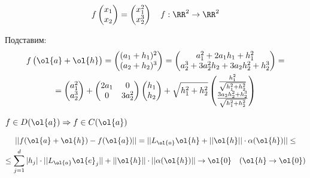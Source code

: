 \begin{example}{}{}
    \[
        f \begin{pmatrix}
            x_1
            \\
            x_2
        \end{pmatrix}
        =
        \begin{pmatrix}
            x_1^2
            \\
            x_2^3
        \end{pmatrix}
        \quad
        f : \RR^2 \to \RR^2
    \]

    Подставим:
    \begin{gather*}
        f \begin{pmatrix}
            \ol{a} + \ol{h}
        \end{pmatrix}
        =
        \begin{pmatrix}
            (a_1 + h_1)^2
            \\
            (a_2 + h_2)^3
        \end{pmatrix}
        =
        \begin{pmatrix}
            a_1^2 + 2 a_1 h_1 + h_1^2
            \\
            a_2^3 + 3 a_2^2 h_2 + 3 a_2 h_2^2 + h_2^3
        \end{pmatrix}
        =
        \\
        =
        \begin{pmatrix}
            a_1^2
            \\
            a_2^3
        \end{pmatrix}
        +
        \begin{pmatrix}
            2a_1 & 0
            \\
            0 & 3a_2^2
        \end{pmatrix}
        \begin{pmatrix}
            h_1
            \\
            h_2
        \end{pmatrix}
        +
        \sqrt{h_1^2 + h_2^2}
        \begin{pmatrix}
            \frac{h_1^2}{\sqrt{h_1^2 + h_2^2}}
            \\
            \frac{3 a_2 h_2^2 + h_2^3}{\sqrt{h_1^2 + h_2^2}}
        \end{pmatrix}
    \end{gather*}
\end{example}

\begin{prop}{}{}
    \( f \in D(\ol{a}) \Rightarrow f \in C(\ol{a}) \)
\end{prop}
\begin{gather*}
    ||f( \ol{a} + \ol{h} ) - f(\ol{a})||
    =
    || L_{\ol{a}} \ol{h} + || \ol{h} || \cdot \alpha(\ol{h}) ||
    \leq
    \\
    \leq
    \sum\limits_{j = 1}^{d} |h_j| \cdot || L_{\ol{a}} \ol{e}_j ||
        + || \ol{h} || \cdot || \alpha(\ol{h}) ||
    \to \ol{0} \quad (\ol{h} \to \ol{0})
\end{gather*}

